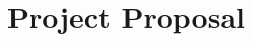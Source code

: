 \documentclass[11pt,a4paper]{article}
\begin{document}



\section{Project Proposal}\label{sec:proposal}
\end{document}
